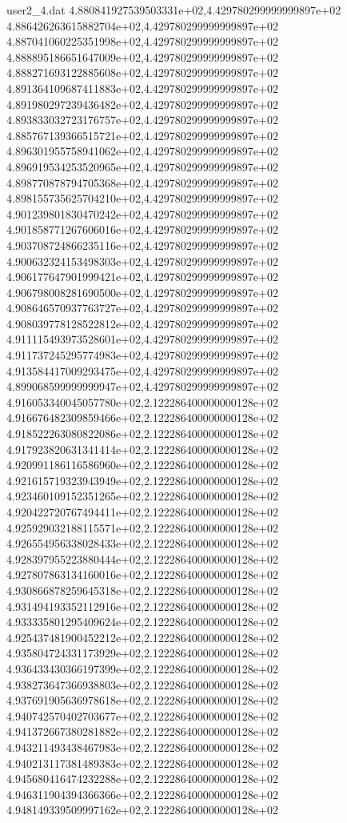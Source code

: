 \begin{filecontents}{user2_4.dat}
4.880841927539503331e+02,4.429780299999999897e+02
4.886426263615882704e+02,4.429780299999999897e+02
4.887041060225351998e+02,4.429780299999999897e+02
4.888895186651647009e+02,4.429780299999999897e+02
4.888271693122885608e+02,4.429780299999999897e+02
4.891364109687411883e+02,4.429780299999999897e+02
4.891980297239436482e+02,4.429780299999999897e+02
4.893833032723176757e+02,4.429780299999999897e+02
4.885767139366515721e+02,4.429780299999999897e+02
4.896301955758941062e+02,4.429780299999999897e+02
4.896919534253520965e+02,4.429780299999999897e+02
4.898770878794705368e+02,4.429780299999999897e+02
4.898155735625704210e+02,4.429780299999999897e+02
4.901239801830470242e+02,4.429780299999999897e+02
4.901858771267606016e+02,4.429780299999999897e+02
4.903708724866235116e+02,4.429780299999999897e+02
4.900632324153498303e+02,4.429780299999999897e+02
4.906177647901999421e+02,4.429780299999999897e+02
4.906798008281690500e+02,4.429780299999999897e+02
4.908646570937763727e+02,4.429780299999999897e+02
4.908039778128522812e+02,4.429780299999999897e+02
4.911115493973528601e+02,4.429780299999999897e+02
4.911737245295774983e+02,4.429780299999999897e+02
4.913584417009293475e+02,4.429780299999999897e+02
4.899068599999999947e+02,4.429780299999999897e+02
4.916053340045057780e+02,2.122286400000000128e+02
4.916676482309859466e+02,2.122286400000000128e+02
4.918522263080822086e+02,2.122286400000000128e+02
4.917923820631341414e+02,2.122286400000000128e+02
4.920991186116586960e+02,2.122286400000000128e+02
4.921615719323943949e+02,2.122286400000000128e+02
4.923460109152351265e+02,2.122286400000000128e+02
4.920422720767494411e+02,2.122286400000000128e+02
4.925929032188115571e+02,2.122286400000000128e+02
4.926554956338028433e+02,2.122286400000000128e+02
4.928397955223880444e+02,2.122286400000000128e+02
4.927807863134160016e+02,2.122286400000000128e+02
4.930866878259645318e+02,2.122286400000000128e+02
4.931494193352112916e+02,2.122286400000000128e+02
4.933335801295409624e+02,2.122286400000000128e+02
4.925437481900452212e+02,2.122286400000000128e+02
4.935804724331173929e+02,2.122286400000000128e+02
4.936433430366197399e+02,2.122286400000000128e+02
4.938273647366938803e+02,2.122286400000000128e+02
4.937691905636978618e+02,2.122286400000000128e+02
4.940742570402703677e+02,2.122286400000000128e+02
4.941372667380281882e+02,2.122286400000000128e+02
4.943211493438467983e+02,2.122286400000000128e+02
4.940213117381489383e+02,2.122286400000000128e+02
4.945680416474232288e+02,2.122286400000000128e+02
4.946311904394366366e+02,2.122286400000000128e+02
4.948149339509997162e+02,2.122286400000000128e+02

\end{filecontents}
